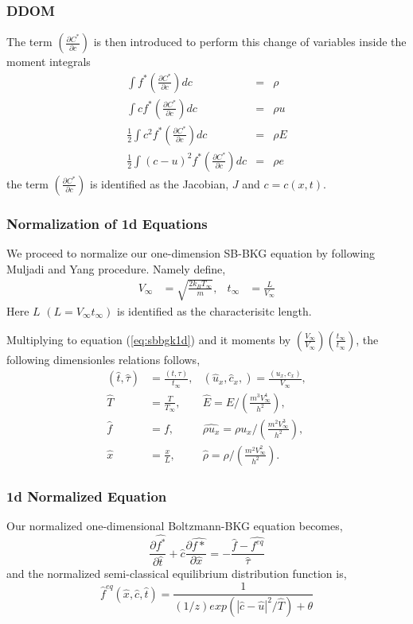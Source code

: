 \begin{frame}
	\frametitle{DDOM}
	The term $(\frac{\partial C^*}{\partial c} )$ is then introduced to perform this change of variables inside the moment integrals
	\begin{eqnarray}
		\int f^* \left(\frac{\partial C^*}{\partial c} \right ) d c  &=& \rho \\
		\int c f^* \left(\frac{\partial C^*}{\partial c} \right ) d c &=& \rho u \nonumber \\
		\frac{1}{2} \int c^2 f^* \left(\frac{\partial C^*}{\partial c} \right ) d c  &=& \rho E \nonumber \\
		\frac{1}{2} \int (c-u)^2 f^* \left(\frac{\partial C^*}{\partial c} \right ) d c &=& \rho e \nonumber
	\end{eqnarray}
	the term $\left(\frac{\partial C^*}{\partial c} \right )$ is identified as the Jacobian, $J$ and $c=c(x,t)$.
\end{frame}

\begin{frame}
	\frametitle{Normalization of 1d Equations}
	We proceed to normalize our one-dimension SB-BKG equation by following Muljadi and Yang \cite{Yang2013} procedure. Namely define, 
	\begin{align*}
	V_\infty &= \sqrt{\frac{2k_BT_\infty}{m}}, & t_\infty &= \frac{L}{V_\infty}
	\end{align*}
	Here $L$ $(L = V_\infty t_\infty)$ is identified as the characterisitc length.
\end{frame}

\begin{frame}
	Multiplying to equation (\ref{eq:sbbgk1d}) and it moments by $(\frac{V_\infty}{V_\infty})(\frac{t_\infty}{t_\infty})$, the following dimensionles relations follows,
	\begin{align*}
	(\hat t, \hat \tau) &= \frac{(t,\tau)}{t_\infty}, & (\hat u_x,\hat c_x,) = \frac{(u_x,c_x)}{V_\infty}, \\
	\hat T &= \frac{T}{T_\infty}, & \hat E = E / \left(\frac{m^3V_\infty^4}{h^2} \right ), \\
	\hat f &= f, &\hat {\rho u_x} = \rho u_x / \left(\frac{m^2V_\infty^3}{h^2} \right ), \\
	\hat x &= \frac{x}{L}, &\hat \rho = \rho / \left(\frac{m^2V_\infty^2}{h^2} \right ).
	\end{align*}
\end{frame}

\begin{frame}
	\frametitle{1d Normalized Equation}
	Our normalized one-dimensional Boltzmann-BKG equation becomes,
	\begin{equation}
	\frac{\partial \hat {f^*}}{\partial \hat t} + \hat c \frac{\partial \hat {f*}}{\partial \hat x} 
		= -\frac{\hat f - \hat {f^{eq}}}{\hat \tau}
	\end{equation}
	and the normalized semi-classical equilibrium distribution function is,
	\begin{equation}
	\hat f^{eq} (\hat x,\hat c,\hat t) = \frac{1}{(1/z) exp(\left | \hat c - \hat u \right |^2 / \hat T)+\theta}
\end{equation}
\end{frame}

